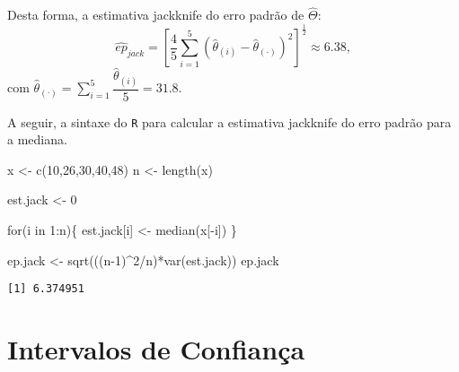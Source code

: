 \documentclass[
  letterpaper,
  DIV=11,
  numbers=noendperiod]{scrreprt}
\newenvironment{Shaded}{\begin{snugshade}}{\end{snugshade}}
\newcommand{\ControlFlowTok}[1]{\textcolor[rgb]{0.00,0.23,0.31}{#1}}
\newcommand{\DecValTok}[1]{\textcolor[rgb]{0.68,0.00,0.00}{#1}}
\newcommand{\FunctionTok}[1]{\textcolor[rgb]{0.28,0.35,0.67}{#1}}
\newcommand{\NormalTok}[1]{\textcolor[rgb]{0.00,0.23,0.31}{#1}}
\newcommand{\OtherTok}[1]{\textcolor[rgb]{0.00,0.23,0.31}{#1}}
\newcommand{\SpecialCharTok}[1]{\textcolor[rgb]{0.37,0.37,0.37}{#1}}
\begin{document}
Desta forma, a estimativa jackknife do erro padrão de \(\hat{\Theta}\):
\[\widehat{ep}_{jack} =\left[ \dfrac{4}{5}\sum_{i=1}^5 (\hat{\theta}_{(i)} - \hat{\theta}_{(\cdot)})^2\right]^{\frac{1}{2}}\approx 6.38,\]
com
\(\hat{\theta}_{(\cdot)}=\sum_{i=1}^5\dfrac{\hat{\theta}_{(i)}}{5}=31.8.\)

A seguir, a sintaxe do \texttt{R} para calcular a estimativa jackknife
do erro padrão para a mediana.

\begin{Shaded}
\begin{Highlighting}[]
\NormalTok{x }\OtherTok{\textless{}{-}} \FunctionTok{c}\NormalTok{(}\DecValTok{10}\NormalTok{,}\DecValTok{26}\NormalTok{,}\DecValTok{30}\NormalTok{,}\DecValTok{40}\NormalTok{,}\DecValTok{48}\NormalTok{)}
\NormalTok{n }\OtherTok{\textless{}{-}} \FunctionTok{length}\NormalTok{(x)}

\NormalTok{est.jack }\OtherTok{\textless{}{-}} \DecValTok{0}

\ControlFlowTok{for}\NormalTok{(i }\ControlFlowTok{in} \DecValTok{1}\SpecialCharTok{:}\NormalTok{n)\{ }
\NormalTok{  est.jack[i] }\OtherTok{\textless{}{-}} \FunctionTok{median}\NormalTok{(x[}\SpecialCharTok{{-}}\NormalTok{i])}
\NormalTok{\}}

\NormalTok{ep.jack }\OtherTok{\textless{}{-}} \FunctionTok{sqrt}\NormalTok{(((n}\DecValTok{{-}1}\NormalTok{)}\SpecialCharTok{\^{}}\DecValTok{2}\SpecialCharTok{/}\NormalTok{n)}\SpecialCharTok{*}\FunctionTok{var}\NormalTok{(est.jack))}
\NormalTok{ep.jack}
\end{Highlighting}
\end{Shaded}

\begin{verbatim}
[1] 6.374951
\end{verbatim}

\section{Intervalos de Confiança}\label{intervalos-de-confianuxe7a}
\end{document}
